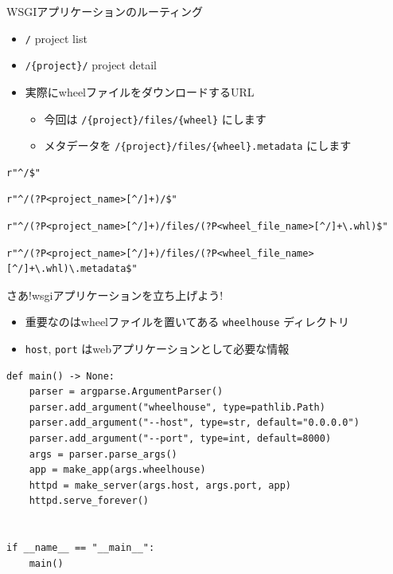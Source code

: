 \documentclass[presentation]{beamer}
\begin{document}
\begin{frame}[label={sec:orgb475c79},fragile]{WSGIアプリケーションのルーティング}
 \begin{itemize}
\item \texttt{/} project list
\item \texttt{/\{project\}/} project detail
\item 実際にwheelファイルをダウンロードするURL
\begin{itemize}
\item 今回は \texttt{/\{project\}/files/\{wheel\}} にします
\item メタデータを \texttt{/\{project\}/files/\{wheel\}.metadata} にします
\end{itemize}
\end{itemize}

\begin{verbatim}
r"^/$"
\end{verbatim}

\begin{verbatim}
r"^/(?P<project_name>[^/]+)/$"
\end{verbatim}
\begin{verbatim}
r"^/(?P<project_name>[^/]+)/files/(?P<wheel_file_name>[^/]+\.whl)$"
\end{verbatim}
\begin{verbatim}
r"^/(?P<project_name>[^/]+)/files/(?P<wheel_file_name>[^/]+\.whl)\.metadata$"
\end{verbatim}
\end{frame}
\begin{frame}[label={sec:orgb916006},fragile]{さあ!wsgiアプリケーションを立ち上げよう!}
 \begin{itemize}
\item 重要なのはwheelファイルを置いてある \texttt{wheelhouse} ディレクトリ
\item \texttt{host}, \texttt{port} はwebアプリケーションとして必要な情報
\end{itemize}

\begin{verbatim}
def main() -> None:
    parser = argparse.ArgumentParser()
    parser.add_argument("wheelhouse", type=pathlib.Path)
    parser.add_argument("--host", type=str, default="0.0.0.0")
    parser.add_argument("--port", type=int, default=8000)
    args = parser.parse_args()
    app = make_app(args.wheelhouse)
    httpd = make_server(args.host, args.port, app)
    httpd.serve_forever()


if __name__ == "__main__":
    main()
\end{verbatim}
\end{frame}
\end{document}
